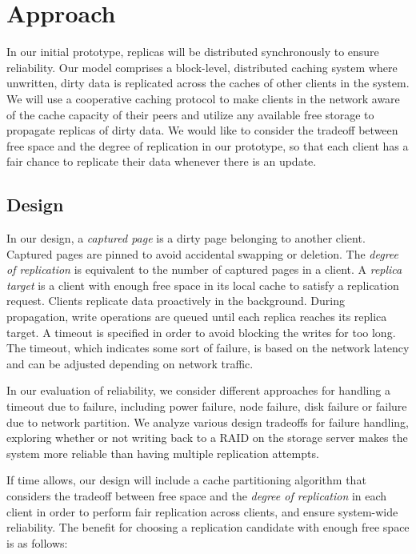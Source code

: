 \section{Approach}

In our initial prototype, replicas will be distributed
synchronously to ensure reliability. Our model comprises a
block-level, distributed caching system where unwritten,
dirty data is replicated across the caches of other
clients in the system. We will use a cooperative caching
protocol to make clients in the network aware of the cache
capacity of their peers and utilize any available free
storage to propagate replicas of dirty data. We would like
to consider the tradeoff between free space and the degree
of replication in our prototype, so that each client has a
fair chance to replicate their data whenever there is
an update.


\subsection{Design}

In our design, a \textit{captured page} is a dirty page
belonging to another client. Captured pages are pinned to
avoid accidental swapping or deletion. The
\textit{degree of replication} is equivalent to the number
of captured pages in a client. A
\textit{replica target} is a client with enough
free space in its local cache to satisfy
a replication request. Clients replicate data proactively
in the background. During propagation, write
operations are queued until each replica reaches its
replica target. A timeout is specified in order to
avoid blocking the writes for too long. The timeout, which
indicates some sort of failure, is based on the network
latency and can be adjusted depending on network traffic.

In our evaluation of reliability, we consider different
approaches for handling a timeout due to failure,
including power failure, node failure, disk failure or
failure due to network partition. We analyze various
design tradeoffs for failure handling, exploring whether
or not writing back to a RAID on the storage server makes
the system more reliable than having multiple replication
attempts.

If time allows, our design will include a cache partitioning
algorithm that considers the tradeoff between free
space and the \textit{degree of replication} in each
client in order to perform fair replication across clients,
and ensure system-wide reliability. The benefit for
choosing a replication candidate with enough free space is
as follows:

